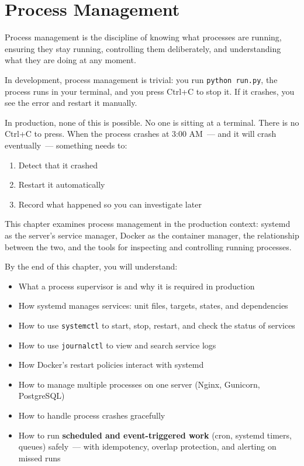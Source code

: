 \setcounter{chapter}{24}
\chapter{Process Management}\label{ch:25-process-management}

\chapterrule

Process management is the discipline of knowing what processes are running, ensuring they stay running, controlling them deliberately, and understanding what they are doing at any moment.

In development, process management is trivial: you run \texttt{python\ run.py}, the process runs in your terminal, and you press Ctrl+C to stop it. If it crashes, you see the error and restart it manually.

In production, none of this is possible. No one is sitting at a terminal. There is no Ctrl+C to press. When the process crashes at 3:00 AM~--- and it will crash eventually~--- something needs to:

\begin{enumerate}
\def\labelenumi{\arabic{enumi}.}
\tightlist
\item
  Detect that it crashed
\item
  Restart it automatically
\item
  Record what happened so you can investigate later
\end{enumerate}

\noindent{}This chapter examines process management in the production context: systemd as the server's service manager, Docker as the container manager, the relationship between the two, and the tools for inspecting and controlling running processes.

\begin{objectives}

By the end of this chapter, you will understand:

\begin{itemize}
\tightlist
\item
  What a process supervisor is and why it is required in production
\item
  How systemd manages services: unit files, targets, states, and dependencies
\item
  How to use \texttt{systemctl} to start, stop, restart, and check the status of services
\item
  How to use \texttt{journalctl} to view and search service logs
\item
  How Docker's restart policies interact with systemd
\item
  How to manage multiple processes on one server (Nginx, Gunicorn, PostgreSQL)
\item
  How to handle process crashes gracefully
\item
  How to run \textbf{scheduled and event-triggered work} (cron, systemd timers, queues) safely~--- with idempotency, overlap protection, and alerting on missed runs
\end{itemize}

\end{objectives}

